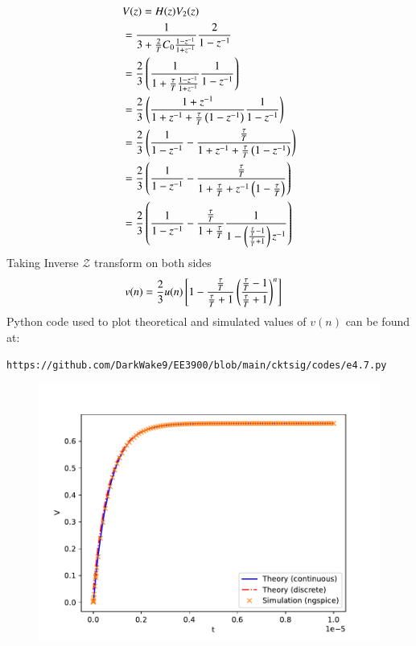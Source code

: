 \documentclass[journal,12pt,twocolumn]{IEEEtran}
\renewcommand\thesection{\arabic{section}}
\begin{document}
\begin{enumerate}[label=\arabic*.,ref=\thesection.\theenumi]
\solution\\
\begin{align}
	&V(z) = H(z)V_2(z)\\
	&= \dfrac{1}{3 +  \frac{2}{T}C_0 \frac{1 - z^{-1}}{1 + z^{-1}}}\frac{2}{1 - z^{-1}}\\
	&= \frac{2}{3}\left(\frac{1}{1 + \frac{\tau}{T}\frac{1 - z^{-1}}{1 + z^{-1}}}\frac{1}{1 - z^{-1}}\right)\\
	&= \frac{2}{3}\left(\frac{1 + z^{-1}}{1 + z^{-1} + \frac{\tau}{T}\left(1 - z^{-1}\right)} \frac{1}{1 - z^{-1}}\right)\\
	&= \frac{2}{3}\left(\frac{1}{1 - z^{-1}} - \frac{\frac{\tau}{T}}{1 + z^{-1} + \frac{\tau}{T}\left(1 - z^{-1}\right)}\right)\\
	&= \frac{2}{3}\left(\frac{1}{1 - z^{-1}} - \frac{\frac{\tau}{T}}{1 + \frac{\tau}{T} + z^{-1}\left(1 - \frac{\tau}{T}\right)}\right)\\
	&= \frac{2}{3}\left(\frac{1}{1 - z^{-1}} - \frac{\frac{\tau}{T}}{1 + \frac{\tau}{T}} \frac{1}{1 - \left(\frac{\frac{\tau}{T} - 1}{\frac{\tau}{T} + 1}\right) z^{-1}}\right)
\end{align}
Taking Inverse $\mathcal{Z}$ transform on both sides
\begin{align}
v(n) &= \frac{2}{3}u(n){}\left[1 - \frac{\frac{\tau}{T}}{\frac{\tau}{T} + 1}\left(\frac{{ \frac{\tau}{T} - 1}}{{\frac{\tau}{T} + 1}}\right)^n\right]
\end{align}
\vspace{2.5cm}
\newline
Python code used to plot theoretical and simulated values of $v(n)$ can be found at:
\begin{lstlisting}
https://github.com/DarkWake9/EE3900/blob/main/cktsig/codes/e4.7.py
\end{lstlisting}
\begin{figure}[!ht]
	\begin{center}
		\includegraphics[width=\columnwidth]{./figs/e4.7.pdf}
	\end{center}
	\label{fig:}	
\end{figure}
\end{enumerate}
\end{document}
